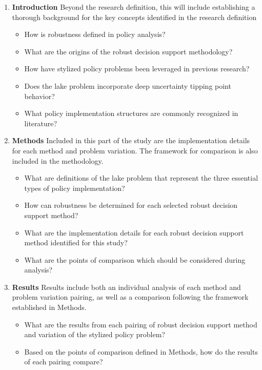 \begin{enumerate}
    \item \textbf{Introduction}\newline
    Beyond the research definition, this will include establishing a thorough background for the key concepts identified in the research definition
        \begin{itemize}[label={--}]
            \item How is robustness defined in policy analysis? 
            \item What are the origins of the robust decision support methodology?
            \item How have stylized policy problems been leveraged in previous research? 
            \item Does the lake problem incorporate deep uncertainty tipping point behavior? 
            \item What policy implementation structures are commonly recognized in literature?
        \end{itemize}
        
    \item \textbf{Methods}
    Included in this part of the study are the implementation details for each method and problem variation. The framework for comparison is also included in the methodology.  
        \begin{itemize}[label={--}]
            \item What are definitions of the lake problem that represent the three essential types of policy implementation?
            \item How can robustness be determined for each selected robust decision support method?
            \item What are the implementation details for each robust decision support method identified for this study?
            \item What are the points of comparison which should be considered during analysis? 
        \end{itemize}
    
    \item \textbf{Results}
    Results include both an individual analysis of each method and problem variation pairing, as well as a comparison following the framework established in Methods. 
        \begin{itemize}[label={--}]
            \item What are the results from each pairing of robust decision support method and variation of the stylized policy problem?
            \item Based on the points of comparison defined in Methods, how do the results of each pairing compare? 
        \end{itemize}


\end{enumerate}
